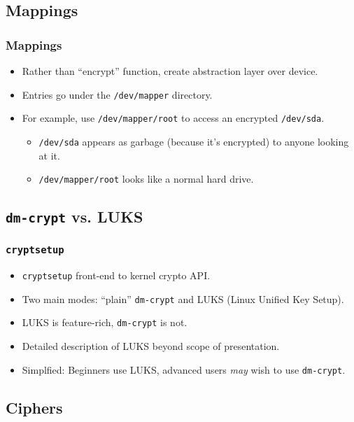 \documentclass[xcolor={dvipsnames,svgnames},hyperref=dvips]{beamer}
\begin{document}
	\subsection{Mappings}
	\begin{frame}
		\frametitle{Mappings}
		\begin{itemize}
		\item Rather than ``encrypt'' function, create abstraction layer over device.
		\item Entries go under the \texttt{/dev/mapper} directory.
		\item For example, use \texttt{/dev/mapper/root} to access an encrypted \texttt{/dev/sda}.
			\begin{itemize}
			\item \texttt{/dev/sda} appears as garbage (because it's encrypted) to anyone looking at it.
			\item \texttt{/dev/mapper/root} looks like a normal hard drive.
			\end{itemize}
		\end{itemize}
	\end{frame}

	\subsection{\texttt{dm-crypt} vs. LUKS}
	\begin{frame}
		\frametitle{\texttt{cryptsetup}}
		\begin{itemize}
		\item \texttt{cryptsetup} front-end to kernel crypto API.
		\item Two main modes: ``plain'' \texttt{dm-crypt} and LUKS (Linux Unified Key Setup).
		\item LUKS is feature-rich, \texttt{dm-crypt} is not.
		\item Detailed description of LUKS beyond scope of presentation.
		\item Simplfied: Beginners use LUKS, advanced users \textit{may} wish to use \texttt{dm-crypt}.
		\end{itemize}
	\end{frame}

	\subsection{Ciphers}
	\begin{frame}
	\end{frame}
\end{document}

